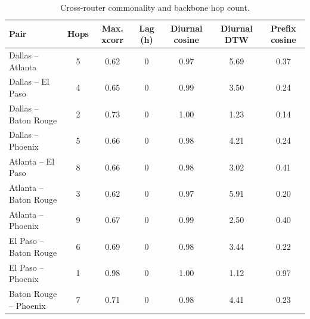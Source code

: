 \begin{table}[t]
\caption{Cross-router commonality and backbone hop count.}
\label{tab:commonality}
\centering
\begin{tabular}{lcccccc}
\hline
\textbf{Pair} & \textbf{Hops} & \textbf{Max. xcorr} & \textbf{Lag (h)} & \textbf{Diurnal cosine} & \textbf{Diurnal DTW} & \textbf{Prefix cosine} \\
\hline
Dallas -- Atlanta & 5 & 0.62 & 0 & 0.97 & 5.69 & 0.37 \\
Dallas -- El Paso & 4 & 0.65 & 0 & 0.99 & 3.50 & 0.24 \\
Dallas -- Baton Rouge & 2 & 0.73 & 0 & 1.00 & 1.23 & 0.14 \\
Dallas -- Phoenix & 5 & 0.66 & 0 & 0.98 & 4.21 & 0.24 \\
Atlanta -- El Paso & 8 & 0.66 & 0 & 0.98 & 3.02 & 0.41 \\
Atlanta -- Baton Rouge & 3 & 0.62 & 0 & 0.97 & 5.91 & 0.20 \\
Atlanta -- Phoenix & 9 & 0.67 & 0 & 0.99 & 2.50 & 0.40 \\
El Paso -- Baton Rouge & 6 & 0.69 & 0 & 0.98 & 3.44 & 0.22 \\
El Paso -- Phoenix & 1 & 0.98 & 0 & 1.00 & 1.12 & 0.97 \\
Baton Rouge -- Phoenix & 7 & 0.71 & 0 & 0.98 & 4.41 & 0.23 \\
\hline
\end{tabular}
\end{table}
